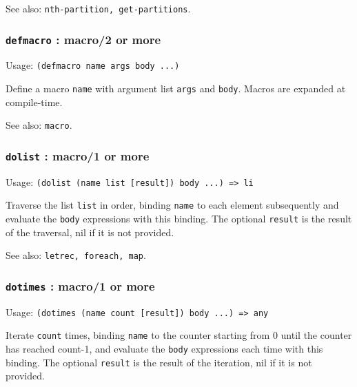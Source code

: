 \documentclass[
]{article}
\newcommand{\passthrough}[1]{#1}
\begin{document}
See also: \passthrough{\lstinline!nth-partition, get-partitions!}.

\hypertarget{defmacro-macro2-or-more}{%
\subsubsection{\texorpdfstring{\texttt{defmacro} : macro/2 or
more}{defmacro : macro/2 or more}}\label{defmacro-macro2-or-more}}

Usage: \passthrough{\lstinline!(defmacro name args body ...)!}

Define a macro \passthrough{\lstinline!name!} with argument list
\passthrough{\lstinline!args!} and \passthrough{\lstinline!body!}.
Macros are expanded at compile-time.

See also: \passthrough{\lstinline!macro!}.

\hypertarget{dolist-macro1-or-more}{%
\subsubsection{\texorpdfstring{\texttt{dolist} : macro/1 or
more}{dolist : macro/1 or more}}\label{dolist-macro1-or-more}}

Usage:
\passthrough{\lstinline!(dolist (name list [result]) body ...) => li!}

Traverse the list \passthrough{\lstinline!list!} in order, binding
\passthrough{\lstinline!name!} to each element subsequently and evaluate
the \passthrough{\lstinline!body!} expressions with this binding. The
optional \passthrough{\lstinline!result!} is the result of the
traversal, nil if it is not provided.

See also: \passthrough{\lstinline!letrec, foreach, map!}.

\hypertarget{dotimes-macro1-or-more}{%
\subsubsection{\texorpdfstring{\texttt{dotimes} : macro/1 or
more}{dotimes : macro/1 or more}}\label{dotimes-macro1-or-more}}

Usage:
\passthrough{\lstinline!(dotimes (name count [result]) body ...) => any!}

Iterate \passthrough{\lstinline!count!} times, binding
\passthrough{\lstinline!name!} to the counter starting from 0 until the
counter has reached count-1, and evaluate the
\passthrough{\lstinline!body!} expressions each time with this binding.
The optional \passthrough{\lstinline!result!} is the result of the
iteration, nil if it is not provided.
\end{document}
